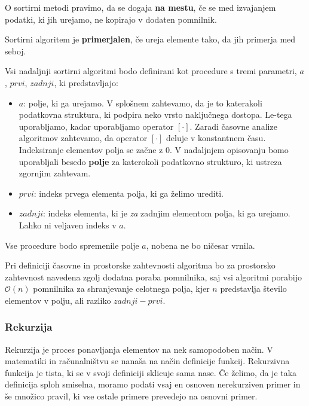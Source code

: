 \documentclass[a4paper,oneside,12pt]{article}
\begin{document}
\begin{definicija}
  O sortirni metodi pravimo, da se dogaja \textbf{na mestu}, če se med izvajanjem podatki, ki
  jih urejamo, ne kopirajo v dodaten pomnilnik.
\end{definicija}

\begin{definicija}
  Sortirni algoritem je \textbf{primerjalen}, če ureja elemente tako, da jih primerja med seboj.
\end{definicija}

Vsi nadaljnji sortirni algoritmi bodo definirani kot procedure s tremi parametri, $a$, $prvi$,
$zadnji$, ki predstavljajo:
\begin{itemize}
  \item $a$: polje, ki ga urejamo. V splošnem zahtevamo, da je to katerakoli podatkovna
    struktura, ki podpira neko vrsto naključnega dostopa. Le-tega uporabljamo, kadar 
    uporabljamo operator $[\cdot]$. Zaradi časovne analize algoritmov zahtevamo, da operator 
    $[\cdot]$ deluje v konstantnem času. Indeksiranje elementov polja se začne z 0.
    V nadaljnjem opisovanju bomo uporabljali besedo
    \textbf{polje} za katerokoli podatkovno strukturo, ki ustreza zgornjim zahtevam.
  \item $prvi$: indeks prvega elementa polja, ki ga želimo urediti.
  \item $zadnji$: indeks elementa, ki je \emph{za} zadnjim elementom polja, ki ga urejamo. Lahko ni
    veljaven indeks v $a$.
\end{itemize}
Vse procedure bodo spremenile polje $a$, nobena ne bo ničesar vrnila.

Pri definiciji časovne in prostorske zahtevnosti algoritma bo za prostorsko zahtevnost 
navedena zgolj dodatna poraba pomnilnika, saj vsi algoritmi porabijo $\mathcal{O}(n)$ pomnilnika za
shranjevanje celotnega polja, kjer $n$ predstavlja število elementov v polju, ali razliko
$zadnji - prvi$.

\subsubsection{Rekurzija}
\label{chapter:rekurzija}
Rekurzija je proces ponavljanja elementov na nek samopodoben način. V matematiki in 
računalništvu se nanaša na način definicije funkcij. Rekurzivna funkcija je tista, 
ki se v svoji definiciji sklicuje sama nase. Če želimo, da je taka definicija sploh 
smiselna, moramo podati vsaj en osnoven nerekurziven primer in še množico pravil, 
ki vse ostale primere prevedejo na osnovni primer.
\end{document}
